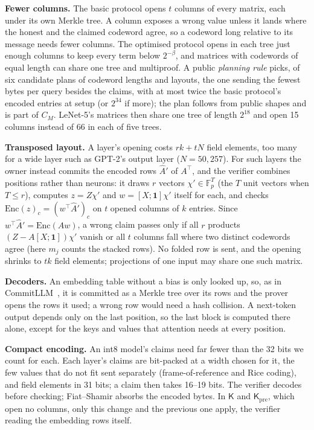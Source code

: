 \documentclass[sigconf,nonacm]{acmart}
\newcommand{\T}{\top}
\newcommand{\F}{\mathbb{F}_p}
\newcommand{\enc}{\mathrm{Enc}}
\newcommand{\Kpre}{\mathsf{K}_{\mathrm{pre}}}
\newcommand{\sK}{\mathsf{K}}
\newcommand{\para}[1]{\par\noindent\textbf{#1}\quad}
\begin{document}
\para{Fewer columns.} The basic protocol opens $t$ columns of every matrix, each under its own
Merkle tree. A column exposes a wrong value unless it lands where the honest and the claimed codeword agree, so a
codeword long relative to its message needs fewer columns. The optimised protocol opens
in each tree just enough columns to keep every term below $2^{-\beta}$, and matrices with codewords
of equal length can share one tree and multiproof. A public \emph{planning rule} picks, of six
candidate plans of codeword lengths and layouts, the one sending the fewest bytes per query
besides the claims, with at most twice the basic protocol's encoded entries at setup (or $2^{34}$
if more); the plan follows from public shapes and is part of $C_M$. LeNet-5's matrices then share
one tree of length $2^{18}$ and open 15 columns instead of 66 in each of five
trees.

\para{Transposed layout.} A layer's opening costs $rk+tN$ field elements, too many for a wide layer
such as GPT-2's output layer ($N{=}50{,}257$). For such layers the owner instead commits the
encoded rows $\hat A'$ of $A^\T$, and the verifier combines positions rather than neurons: it draws
$r$ vectors $\chi' \in \F^{T}$ (the $T$ unit vectors when $T \le r$), computes $z = Z\chi'$ and
$w = [X;\mathbf 1]\chi'$ itself for each, and checks $\enc(z)_c = (w^\T \hat A')_c$ on $t$ opened
columns of $k$ entries. Since $w^\T\hat A' = \enc(Aw)$, a wrong claim passes only if all $r$
products $(Z-A[X;\mathbf 1])\chi'$ vanish or all $t$ columns fall where two distinct codewords
agree (here $m_j$ counts the stacked rows). No folded row is sent, and the opening
shrinks to $tk$ field elements; projections of one input may share one such matrix.

\para{Decoders.} An embedding table without a bias is only looked up, so, as in
CommitLLM~\cite{commitllm2026}, it is committed as a Merkle tree over its rows and the prover opens
the rows it used; a wrong row would need a hash collision. A next-token output depends only on the
last position, so the last block is computed there alone, except for the keys and values that
attention needs at every position.

\para{Compact encoding.} An int8 model's claims need far fewer than the 32 bits we count for each.
Each layer's claims are bit-packed at a width chosen for it, the few
values that do not fit sent separately (frame-of-reference and Rice coding), and field elements
in 31 bits; a claim then takes 16--19 bits. The verifier decodes before checking; Fiat--Shamir
absorbs the encoded bytes. In $\sK$ and $\Kpre$, which open no columns, only this change and the
previous one apply, the verifier reading the embedding rows itself.
\end{document}
